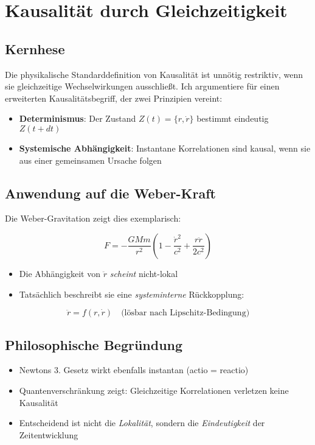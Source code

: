 \section{Kausalität durch Gleichzeitigkeit}
\label{sec:gleichzeitige_kausalitaet}

\subsection{Kernhese}
Die physikalische Standarddefinition von Kausalität ist unnötig restriktiv, wenn sie gleichzeitige Wechselwirkungen ausschließt. Ich argumentiere für einen erweiterten Kausalitätsbegriff, der zwei Prinzipien vereint:

\begin{itemize}
    \item \textbf{Determinismus}: Der Zustand $Z(t) = \{r, \dot{r}\}$ bestimmt eindeutig $Z(t+dt)$
    \item \textbf{Systemische Abhängigkeit}: Instantane Korrelationen sind kausal, wenn sie aus einer gemeinsamen Ursache folgen
\end{itemize}

\subsection{Anwendung auf die Weber-Kraft}
Die Weber-Gravitation zeigt dies exemplarisch:

\begin{equation}
    F = -\frac{GMm}{r^2}\left(1 - \frac{\dot{r}^2}{c^2} + \frac{r\ddot{r}}{2c^2}\right)
\end{equation}

\begin{itemize}
    \item Die Abhängigkeit von $\ddot{r}$ \textit{scheint} nicht-lokal
    \item Tatsächlich beschreibt sie eine \textit{systeminterne} Rückkopplung:
\end{itemize}

\begin{equation}
    \ddot{r} = f(r, \dot{r}) \quad \text{(lösbar nach Lipschitz-Bedingung)}
\end{equation}

\subsection{Philosophische Begründung}
\begin{itemize}
    \item Newtons 3. Gesetz wirkt ebenfalls instantan (actio = reactio)
    \item Quantenverschränkung zeigt: Gleichzeitige Korrelationen verletzen keine Kausalität
    \item Entscheidend ist nicht die \textit{Lokalität}, sondern die \textit{Eindeutigkeit} der Zeitentwicklung
\end{itemize}

